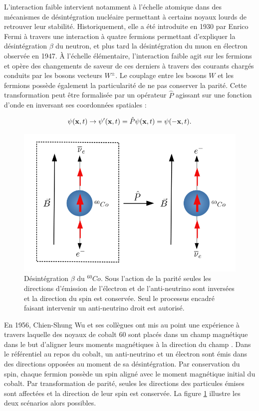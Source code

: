         L'interaction faible intervient notamment à l'échelle atomique dans des mécanismes de désintégration nucléaire permettant à certains noyaux lourds de retrouver leur stabilité. Historiquement, elle a été introduite en 1930 par Enrico Fermi à travers une interaction à quatre fermions permettant d'expliquer la désintégration $\beta$ du neutron, et plus tard la désintégration du muon en électron observée en 1947. À l'échelle élémentaire, l'interaction faible agit sur les fermions et opère des changements de saveur de ces derniers à travers des courants chargés conduits par les bosons vecteurs $W^{\pm}$. Le couplage entre les bosons $W$ et les fermions possède également la particularité de ne pas conserver la parité. Cette transformation peut être formalisée par un opérateur $\hat{P}$ agissant sur une fonction d'onde en inversant ses coordonnées spatiales : 

        $$\psi(\vb{x},t)\rightarrow\psi'(\vb{x},t)=\hat{P}\psi(\vb{x},t)=\psi(-\vb{x},t).$$

        \begin{figure}
        \centering
            \includegraphics[scale=0.4]{Chapitre2/Images/wuexp.png} 
            \caption{Désintégration $\beta$ du $^{60}Co$. Sous l'action de la parité seules les directions d'émission de l'électron et de l'anti-neutrino sont inversées et la direction du spin est conservée. Seul le processus encadré faisant intervenir un anti-neutrino droit est autorisé.}
        \label{wuexp}
        \end{figure}

        En 1956, Chien-Shung Wu et ses collègues ont mis au point une expérience à travers laquelle des noyaux de cobalt 60 sont placés dans un champ magnétique dans le but d'aligner leurs moments magnétiques à la direction du champ \cite{Wu}. Dans le référentiel au repos du cobalt, un anti-neutrino et un électron sont émis dans des directions opposées au moment de sa désintégration. Par conservation du spin, chaque fermion possède un spin aligné avec le moment magnétique initial du cobalt. Par transformation de parité, seules les directions des particules émises sont affectées et la direction de leur spin est conservée. La figure \ref{wuexp} illustre les deux scénarios alors possibles. 

